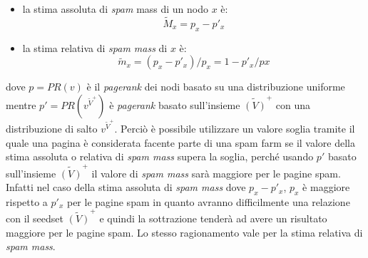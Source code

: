 \begin{itemize}
 \item la stima assoluta di \textit{spam} mass di un nodo \(x\) è:
 \begin{equation}
 \tilde{M}_x=p_x-p'_x
\end{equation}
\item la stima relativa di \textit{spam mass} di \(x\) è:
 \begin{equation}
 \tilde{m}_x=(p_x-p'_x)/p_x=1-p'_x/px
\end{equation}
\end{itemize}
dove \(p=PR(v)\) è il \textit{pagerank} dei nodi basato su una distribuzione uniforme mentre \(p'=PR(v^{\tilde{V}^+})\) è \textit{pagerank} basato sull'insieme \(\tilde{(V)}^+\)  con una distribuzione di salto \(v^{\tilde{V}^+}\). Perciò è possibile utilizzare un valore soglia tramite il quale una pagina è considerata facente parte di una spam farm se il valore della stima assoluta o relativa di \textit{spam mass} supera la soglia, perché usando \(p'\) basato sull'insieme \(\tilde{(V)}^+\) il valore di \textit{spam mass} sarà maggiore per le pagine spam. Infatti nel caso della stima assoluta di \textit{spam mass} dove \(p_x-p'_x\), \(p_x\) è maggiore rispetto a \(p'_x\) per le pagine spam in quanto avranno difficilmente una relazione con il seedset \(\tilde{(V)}^+\) e quindi la sottrazione tenderà ad avere un risultato maggiore per le pagine spam. Lo stesso ragionamento vale per la stima relativa di \textit{spam mass}.

